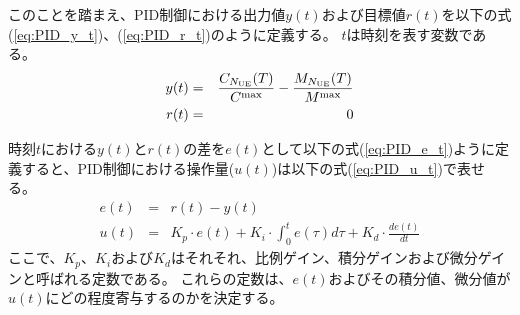 \documentclass[a4j]{ujarticle}
\begin{document}
このことを踏まえ、PID制御における出力値$y(t)$および目標値$r(t)$を以下の式(\ref{eq:PID_y_t})、(\ref{eq:PID_r_t})のように定義する。
$t$は時刻を表す変数である。
\begin{eqnarray}
  y(t) &=& \frac{C_{N_{\rm UE}}(T)}{C^{\rm max}} - \frac{M_{N_{\rm UE}}(T)}{M^{\rm max}}
  \label{eq:PID_y_t} \\
  r(t) &=& 0
  \label{eq:PID_r_t}
\end{eqnarray}
%

時刻$t$における$y(t)$と$r(t)$の差を$e(t)$として以下の式(\ref{eq:PID_e_t})ように定義すると、PID制御における操作量($u(t)$)は以下の式(\ref{eq:PID_u_t})で表せる。
\begin{eqnarray}
  e(t) &=& r(t) - y(t)
  \label{eq:PID_e_t} \\
  u(t) &=& K_p \cdot e(t) + K_i \cdot \int_0^t e(\tau) d\tau + K_d \cdot \frac{de(t)}{dt}
  \label{eq:PID_u_t}
\end{eqnarray}
ここで、$K_p$、$K_i$および$K_d$はそれそれ、比例ゲイン、積分ゲインおよび微分ゲインと呼ばれる定数である。
これらの定数は、$e(t)$およびその積分値、微分値が$u(t)$にどの程度寄与するのかを決定する。
\end{document}
